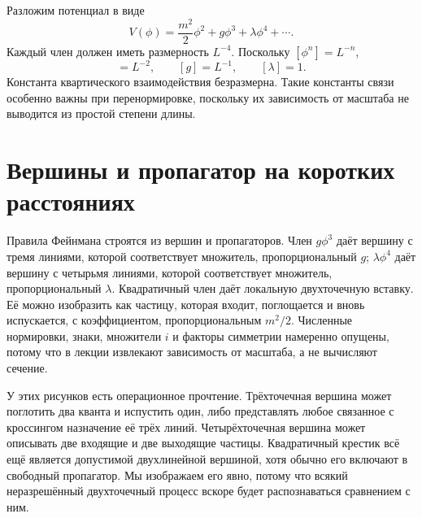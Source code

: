 Разложим потенциал в виде
\begin{equation}
V(\phi)=\frac{m^2}{2}\phi^2+g\phi^3+\lambda\phi^4+\cdots.
\label{eq:scalar-potential}
\end{equation}
Каждый член должен иметь размерность \(L^{-4}\). Поскольку
\([\phi^n]=L^{-n}\),
\begin{equation}
[m^2]=L^{-2},
\qquad
[g]=L^{-1},
\qquad
[\lambda]=1.
\label{eq:coupling-dimensions}
\end{equation}
Константа квартического взаимодействия безразмерна. Такие константы связи особенно важны при перенормировке, поскольку их зависимость от масштаба не выводится из простой степени длины.

\begin{classroomqa}
\end{classroomqa}

\section{Вершины и пропагатор на коротких расстояниях}

Правила Фейнмана строятся из вершин и пропагаторов. Член \(g\phi^3\) даёт вершину с тремя линиями, которой соответствует множитель, пропорциональный \(g\); \(\lambda\phi^4\) даёт вершину с четырьмя линиями, которой соответствует множитель, пропорциональный \(\lambda\). Квадратичный член даёт локальную двухточечную вставку. Её можно изобразить как частицу, которая входит, поглощается и вновь испускается, с коэффициентом, пропорциональным \(m^2/2\). Численные нормировки, знаки, множители \(i\) и факторы симметрии намеренно опущены, потому что в лекции извлекают зависимость от масштаба, а не вычисляют сечение.

У этих рисунков есть операционное прочтение. Трёхточечная вершина может поглотить два кванта и испустить один, либо представлять любое связанное с кроссингом назначение её трёх линий. Четырёхточечная вершина может описывать две входящие и две выходящие частицы. Квадратичный крестик всё ещё является допустимой двухлинейной вершиной, хотя обычно его включают в свободный пропагатор. Мы изображаем его явно, потому что всякий неразрешённый двухточечный процесс вскоре будет распознаваться сравнением с ним.

